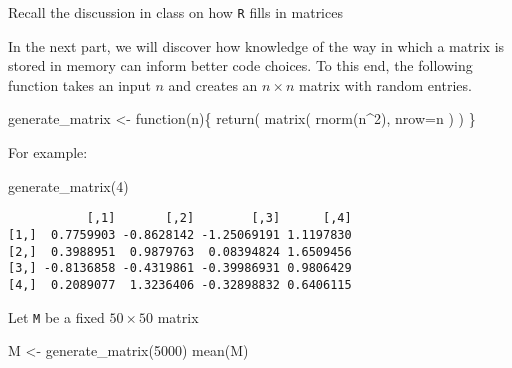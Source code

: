 \documentclass[
  letterpaper,
  DIV=11,
  numbers=noendperiod]{scrartcl}
\newenvironment{Shaded}{\begin{snugshade}}{\end{snugshade}}
\newcommand{\AttributeTok}[1]{\textcolor[rgb]{0.40,0.45,0.13}{#1}}
\newcommand{\ControlFlowTok}[1]{\textcolor[rgb]{0.00,0.23,0.31}{#1}}
\newcommand{\DecValTok}[1]{\textcolor[rgb]{0.68,0.00,0.00}{#1}}
\newcommand{\FunctionTok}[1]{\textcolor[rgb]{0.28,0.35,0.67}{#1}}
\newcommand{\NormalTok}[1]{\textcolor[rgb]{0.00,0.23,0.31}{#1}}
\newcommand{\OtherTok}[1]{\textcolor[rgb]{0.00,0.23,0.31}{#1}}
\newcommand{\SpecialCharTok}[1]{\textcolor[rgb]{0.37,0.37,0.37}{#1}}
\begin{document}
\begin{tcolorbox}[enhanced jigsaw, toprule=.15mm, breakable, rightrule=.15mm, coltitle=black, colframe=quarto-callout-warning-color-frame, bottomtitle=1mm, toptitle=1mm, titlerule=0mm, opacityback=0, title=\textcolor{quarto-callout-warning-color}{\faExclamationTriangle}\hspace{0.5em}{Tip}, bottomrule=.15mm, arc=.35mm, leftrule=.75mm, colback=white, opacitybacktitle=0.6, left=2mm, colbacktitle=quarto-callout-warning-color!10!white]

Recall the discussion in class on how \texttt{R} fills in matrices

\end{tcolorbox}

In the next part, we will discover how knowledge of the way in which a
matrix is stored in memory can inform better code choices. To this end,
the following function takes an input \(n\) and creates an
\(n \times n\) matrix with random entries.

\begin{Shaded}
\begin{Highlighting}[]
\NormalTok{generate\_matrix }\OtherTok{\textless{}{-}} \ControlFlowTok{function}\NormalTok{(n)\{}
    \FunctionTok{return}\NormalTok{(}
        \FunctionTok{matrix}\NormalTok{(}
            \FunctionTok{rnorm}\NormalTok{(n}\SpecialCharTok{\^{}}\DecValTok{2}\NormalTok{),}
            \AttributeTok{nrow=}\NormalTok{n}
\NormalTok{        )}
\NormalTok{    )}
\NormalTok{\}}
\end{Highlighting}
\end{Shaded}

For example:

\begin{Shaded}
\begin{Highlighting}[]
\FunctionTok{generate\_matrix}\NormalTok{(}\DecValTok{4}\NormalTok{)}
\end{Highlighting}
\end{Shaded}

\begin{verbatim}
           [,1]       [,2]        [,3]      [,4]
[1,]  0.7759903 -0.8628142 -1.25069191 1.1197830
[2,]  0.3988951  0.9879763  0.08394824 1.6509456
[3,] -0.8136858 -0.4319861 -0.39986931 0.9806429
[4,]  0.2089077  1.3236406 -0.32898832 0.6406115
\end{verbatim}

Let \texttt{M} be a fixed \(50 \times 50\) matrix

\begin{Shaded}
\begin{Highlighting}[]
\NormalTok{M }\OtherTok{\textless{}{-}} \FunctionTok{generate\_matrix}\NormalTok{(}\DecValTok{5000}\NormalTok{)}
\FunctionTok{mean}\NormalTok{(M)}
\end{Highlighting}
\end{Shaded}
\end{document}
